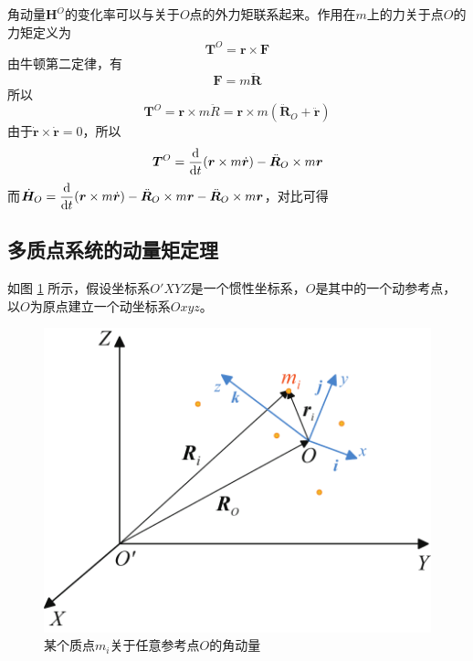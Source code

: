 角动量$\bm{H}^O$的变化率可以与关于$O$点的外力矩联系起来。作用在$m$上的力关于点$O$的力矩定义为
\begin{equation}
    \bm{T}^O = \bm{r} \times \bm{F}
\end{equation}
由牛顿第二定律，有
\begin{equation}
    \bm{F} = m \ddot{\bm{R}}
\end{equation}
所以
\begin{equation}
    \bm{T}^O = \bm{r} \times m \ddot{R} = \bm{r} \times m (\ddot{\bm{R}}_O + \ddot{\bm{r}})
\end{equation}
由于$\dot{\bm{r}} \times \dot{\bm{r}} = 0$，所以
\begin{equation}
    \bm{T}^O = \dfrac{{\rm{d}} }{{\rm{d}} t} (\bm{r} \times m \dot{\bm{r}}) - \ddot{\bm{R}}_O \times m \bm{r}
\end{equation}
而$\dot{\bm{H}}_O  =  \dfrac{{\rm{d}} }{{\rm{d}} t} (\bm{r} \times m \dot{\bm{r}} ) - \ddot{\bm{R}}_O \times m \bm{r} - \ddot{\bm{R}}_O \times m \bm{r}$，对比可得


\clearpage

\subsection{多质点系统的动量矩定理}
如图 \ref{多质点角动量} 所示，假设坐标系$O'XYZ$是一个惯性坐标系，$O$是其中的一个动参考点，以$O$为原点建立一个动坐标系$Oxyz$。
\begin{figure}[!htb]
    \centering
    \includegraphics[width=0.4\linewidth]{pic/多质点角动量}
    \vspace*{-1em}
    \caption{某个质点$m_i$关于任意参考点$O$的角动量}
    \label{多质点角动量}
\end{figure}

